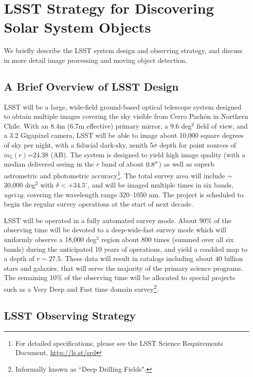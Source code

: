 \section{LSST Strategy for Discovering Solar System Objects}
\label{sec:strategy}

We briefly describe the LSST system design and observing strategy, and discuss in more
detail image processing and moving object detection.

\subsection{A Brief Overview of LSST  Design}

LSST will be a large, wide-field ground-based optical telescope system
designed to obtain multiple images covering the sky visible
from Cerro Pach\'{o}n in Northern Chile. With an 8.4m (6.7m effective) 
primary mirror, a 9.6 deg$^2$ field of view, and a 3.2 Gigapixel camera,
LSST will be able to image about 10,000 square
degrees of sky per night, with a fiducial dark-sky, zenith 5$\sigma$ depth
for point sources of $m_5(r)$=24.38 (AB). The system is designed to yield
high image quality (with a median delivered seeing in the $r$ band of
about $0.8\mbox{$^{\prime\prime}$}$) as well as superb astrometric  and photometric
accuracy\footnote{For detailed specifications, please see the LSST
Science Requirements Document, \url{http://ls.st/srd}}. The total survey
area will include $\sim$30,000 deg$^2$ with $\delta<+34.5^\circ$, and
will be imaged multiple times in six bands, $ugrizy$, covering the
wavelength range 320--1050 nm. The project is scheduled to  begin the
regular survey operations at the start of next decade.

LSST will be operated in a fully automated survey mode. About 90\% of the
observing time will be devoted to a deep-wide-fast survey mode which will
uniformly observe a 18,000 deg$^2$ region about 800 times (summed over
all six bands) during the anticipated 10 years of operations, and yield a coadded map
to a depth of $r\sim27.5$. These data will result in catalogs including about
$40$ billion stars and galaxies, that will serve the majority of the
primary science programs. The remaining 10\% of the observing time
will be allocated to special projects such as a Very Deep and Fast
time domain survey\footnote{Informally known as ``Deep Drilling Fields".}.



\subsection{LSST Observing Strategy}

